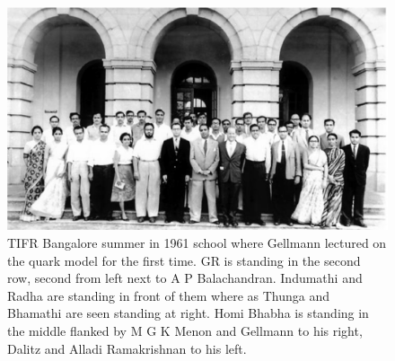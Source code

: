 \begin{figure}[H]
\centering
\includegraphics[scale=0.35]{src/images/chap25/6.eps}
\caption{TIFR Bangalore summer in 1961 school where Gellmann lectured on the
quark model for the first time. GR is standing in the second row, second from left
next to A P Balachandran. Indumathi and Radha are standing in front of them where
as Thunga and Bhamathi are seen standing at right. Homi Bhabha is standing in
the middle flanked by M G K Menon and Gellmann to his right, Dalitz and Alladi
Ramakrishnan to his left.}
\end{figure}


